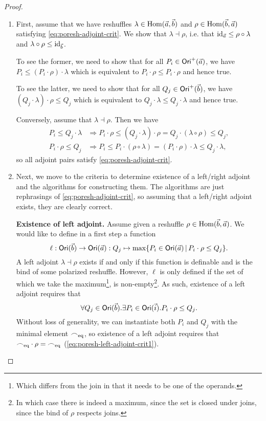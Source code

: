 \documentclass[a4paper]{memoir}
\begin{document}
\begin{proof}
	\begin{enumerate}
		\item First, assume that we have reshuffles $\lambda \in {\mathrm{Hom}}(\vec a, \vec b)$ and $\rho \in {\mathrm{Hom}}(\vec b, \vec a)$ satisfying \cref{eq:poresh-adjoint-crit}.
		We show that $\lambda \dashv \rho$, i.e. that $\mathrm{id}_{\vec a} \leq \rho \circ \lambda$ and $\lambda \circ \rho \leq \mathrm{id}_{\vec b}$.
		
		To see the former, we need to show that for all $P_i \in {\mathsf{Ori}}^+(\vec a)$, we have $P_i \leq (P_i \cdot \rho) \cdot \lambda$ which is equivalent to $P_i \cdot \rho \leq P_i \cdot \rho$ and hence true.
		
		To see the latter, we need to show that for all $Q_j \in {\mathsf{Ori}}^+(\vec b)$, we have $(Q_j \cdot \lambda) \cdot \rho \leq Q_j$ which is equivalent to $Q_j \cdot \lambda \leq Q_j \cdot \lambda$ and hence true.
		
		Conversely, assume that $\lambda \dashv \rho$. Then we have
		\begin{align*}
			P_i \leq Q_j \cdot \lambda &\Rightarrow P_i \cdot \rho \leq (Q_j \cdot \lambda) \cdot \rho = Q_j \cdot (\lambda \circ \rho) \leq Q_j, \\
			P_i \cdot \rho \leq Q_j &\Rightarrow P_i \leq P_i \cdot (\rho \circ \lambda) = (P_i \cdot \rho) \cdot \lambda \leq Q_j \cdot \lambda,
		\end{align*}
		so all adjoint pairs satisfy \cref{eq:poresh-adjoint-crit}.
		
		\item Next, we move to the criteria to determine existence of a left/right adjoint and the algorithms for constructing them.
		The algorithms are just rephrasings of \cref{eq:poresh-adjoint-crit}, so assuming that a left/right adjoint exists, they are clearly correct.
		
		\textbf{Existence of left adjoint.} Assume given a reshuffle $\rho \in {\mathrm{Hom}}(\vec b, \vec a)$.
		We would like to define in a first step a function
		\[
			\ell : {\mathsf{Ori}}(\vec b) \to {\mathsf{Ori}}(\vec a) : Q_j \mapsto \max \mathopen{}\left\{ P_i \in {\mathsf{Ori}}(\vec a) \,\middle|\, P_i \cdot \rho \leq Q_j \right\}\mathclose{}.
		\]
		A left adjoint $\lambda \dashv \rho$ exists if and only if this function is definable and is the bind of some polarized reshuffle.
		However, $\ell$ is only defined if the set of which we take the maximum\footnote{Which differs from the join in that it needs to be one of the operands.}, is non-empty\footnote{In which case there is indeed a maximum, since the set is closed under joins, since the bind of $\rho$ respects joins.}.
		As such, existence of a left adjoint requires that
		\[
			\forall Q_j \in {\mathsf{Ori}}(\vec b). \exists P_i \in {\mathsf{Ori}}(\vec i).P_i \cdot \rho \leq Q_j.
		\]
		Without loss of generality, we can instantiate both $P_i$ and $Q_j$ with the minimal element ${\frown}_{{\mathrm{eq}}}$, so existence of a left adjoint requires that ${\frown}_{{\mathrm{eq}}} \cdot \rho = {\frown}_{{\mathrm{eq}}}$ (\cref{eq:poresh-left-adjoint-crit1}).
		

\end{enumerate}
\end{proof}
\end{document}
